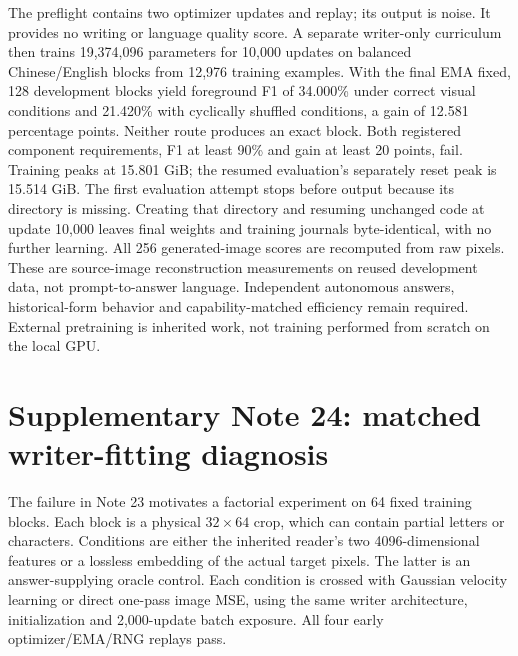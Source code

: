 \documentclass[10pt,a4paper]{article}
\begin{document}
The preflight contains two optimizer updates and replay; its output is noise.
It provides no writing or language quality score. A separate writer-only
curriculum then trains 19,374,096 parameters for 10,000 updates on balanced
Chinese/English blocks from 12,976 training examples. With the final EMA fixed,
128 development blocks yield foreground F1 of 34.000\% under correct visual
conditions and 21.420\% with cyclically shuffled conditions, a gain of 12.581
percentage points. Neither route produces an exact block. Both registered
component requirements, F1 at least 90\% and gain at least 20 points, fail.
Training peaks at 15.801 GiB; the resumed evaluation's separately reset peak
is 15.514 GiB. The first evaluation attempt stops before output because its
directory is missing. Creating that directory and resuming unchanged code at
update 10,000 leaves final weights and training journals byte-identical, with
no further learning. All 256 generated-image scores are recomputed from raw
pixels. These are source-image reconstruction measurements on reused
development data, not prompt-to-answer language. Independent autonomous
answers, historical-form behavior and capability-matched efficiency remain
required. External pretraining is inherited work, not training performed
from scratch on the local GPU.


\section*{Supplementary Note 24: matched writer-fitting diagnosis}
The failure in Note 23 motivates a factorial experiment on 64 fixed training
blocks. Each block is a physical $32\times64$ crop, which can contain partial
letters or characters. Conditions are either the inherited reader's two
4096-dimensional features or a lossless embedding of the actual target
pixels. The latter is an answer-supplying oracle control. Each condition is
crossed with Gaussian velocity learning or direct one-pass image MSE, using
the same writer architecture, initialization and 2,000-update batch exposure.
All four early optimizer/EMA/RNG replays pass.
\end{document}
